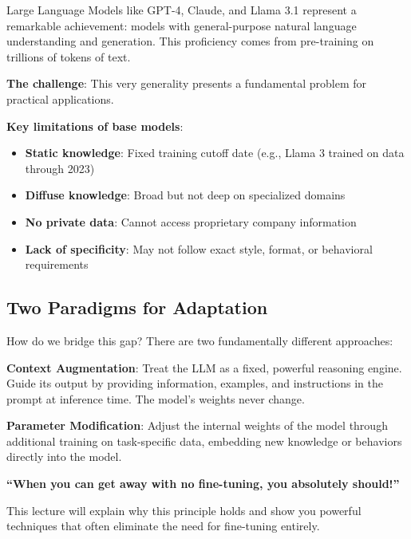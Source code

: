 \documentclass{article}
\begin{document}
Large Language Models like GPT-4, Claude, and Llama 3.1 represent a remarkable achievement: models with general-purpose natural language understanding and generation. This proficiency comes from pre-training on trillions of tokens of text.

\textbf{The challenge}: This very generality presents a fundamental problem for practical applications.

\begin{center}
\end{center}

\textbf{Key limitations of base models}:
\begin{itemize}
\item \textbf{Static knowledge}: Fixed training cutoff date (e.g., Llama 3 trained on data through 2023)
\item \textbf{Diffuse knowledge}: Broad but not deep on specialized domains
\item \textbf{No private data}: Cannot access proprietary company information
\item \textbf{Lack of specificity}: May not follow exact style, format, or behavioral requirements
\end{itemize}

\subsection{Two Paradigms for Adaptation}

How do we bridge this gap? There are two fundamentally different approaches:

\begin{center}
\end{center}

\textbf{Context Augmentation}: Treat the LLM as a fixed, powerful reasoning engine. Guide its output by providing information, examples, and instructions in the prompt at inference time. The model's weights never change.

\textbf{Parameter Modification}: Adjust the internal weights of the model through additional training on task-specific data, embedding new knowledge or behaviors directly into the model.

\begin{tcolorbox}[colback=yellow!5!white, colframe=orange!50!black, title=Central Principle]
\textbf{``When you can get away with no fine-tuning, you absolutely should!''}

This lecture will explain why this principle holds and show you powerful techniques that often eliminate the need for fine-tuning entirely.
\end{tcolorbox}
\end{document}
